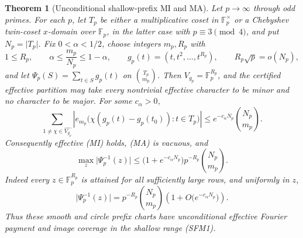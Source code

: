 \documentclass[12pt,a4paper]{amsart}
\numberwithin{equation}{section}
\newtheorem{theorem}{Theorem}[section]
\theoremstyle{remark}
\newcommand{\F}{\mathbb F}
\newcommand{\abs}[1]{\lvert #1\rvert}
\begin{document}
\begin{theorem}[Unconditional shallow-prefix MI and MA]
\label{thm:unconditional-shallow-mi-ma}
Let \(p\to\infty\) through odd primes.  For each \(p\), let \(T_p\) be
either a multiplicative coset in \(\F_p^\times\) or a Chebyshev
twin-coset \(x\)-domain over \(\F_p\), in the latter case with
\(p\equiv3\pmod4\), and put \(N_p=\abs{T_p}\).
Fix \(0<\alpha<1/2\), choose integers \(m_p,R_p\) with
\[
 1\le R_p,\qquad
 \alpha\le \frac{m_p}{N_p}\le1-\alpha,
 \qquad g_p(t)=(t,t^2,\ldots,t^{R_p}),
 \qquad R_p\sqrt p=o(N_p),                         \tag{SFM1}
\]
and let \(\Psi_p(S)=\sum_{t\in S}g_p(t)\) on
\(\binom{T_p}{m_p}\).  Then \(V_{g_p}=\F_p^{R_p}\), and the certified effective partition may take
every nontrivial effective character to be minor and no character to be
major.  For some \(c_\alpha>0\),
\[
 \sum_{1\ne\chi\in\widehat{V_{g_p}}}
 \left|e_{m_p}\bigl(\chi(g_p(t)-g_p(t_0)):t\in T_p\bigr)\right|
 \le e^{-c_\alpha N_p}\binom{N_p}{m_p}.            \tag{SFM2}
\]
Consequently effective \textup{(MI)} holds, \textup{(MA)} is vacuous,
and
\[
 \max_z\abs{\Psi_p^{-1}(z)}
 \le\bigl(1+e^{-c_\alpha N_p}\bigr)
       p^{-R_p}\binom{N_p}{m_p}.                   \tag{SFM3}
\]
Indeed every \(z\in\F_p^{R_p}\) is attained for all sufficiently large
rows, and uniformly in \(z\),
\[
 \abs{\Psi_p^{-1}(z)}
 =p^{-R_p}\binom{N_p}{m_p}
  \left(1+O\bigl(e^{-c_\alpha N_p}\bigr)\right).   \tag{SFM4}
\]
Thus these smooth and circle prefix charts have unconditional effective
Fourier payment and image coverage in the shallow range \textup{(SFM1)}.
\end{theorem}
\end{document}
